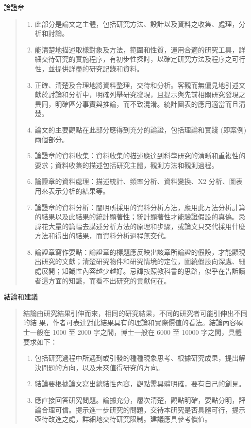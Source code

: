 \documentclass[
    writingLanguage=chinese, %
    addPageTitle=on,  %
    addDeclaration=on, %
    addMUSTlogo=on, %
    addFigTOC=on, %
    addTabTOC=on, %
    refIndent=off, %
    printMod=off, %
]{.def/must}
\begin{document}
\noindent\faHandORight 論證章
\begin{quote}
\begin{enumerate}
    \item 此部分是論文之主體，包括研究方法、設計以及資料之收集、處理，分析和討論。
    \item  能清楚地描述取樣對象及方法，範圍和性質，運用合適的研究工具，詳細交待研究的實施程序，有初步性探討，以確定研究方法及程序之可行性，並提供詳盡的研究記錄和資料。
    \item  正確、清楚及合理地將資料整理，交待和分析。客觀而無偏見地引述文獻於討論和分析中，明確列舉研究發現，且提示與先前相關研究發現之異同，明確區分事實與推論，而不致混淆。統計圖表的應用適當而且清楚。
    \item 論文的主要觀點在此部分應得到充分的論證，包括理論和實踐 (即案例)兩個部分。
    \item 論證章的資料收集：資料收集的描述應達到科學研究的清晰和重複性的要求；資料收集的描述包括研究主體，觀測方法和觀測過程。
    \item 論證章的資料處理：描述統計、頻率分析、資料變換、X2 分析、圖表用來表示分析的結果等。
    \item 論證章的資料分析：闡明所採用的資料分析方法，應用此方法分析計算的結果以及此結果的統計顯著性；統計顯著性才能驗證假設的真偽。忌諱花大量的篇幅去講述分析方法的原理和步驟，或論文只交代採用什麼方法和得出的結果，而資料分析過程無交代。
  \item 論證章寫作要點：論證章的標題應反映出該章所論證的假設，才能顯現出研究的文獻；清楚研究物件和研究情境的定位，圍繞假設向深處、細處展開；知識性內容越少越好。忌諱按照教科書的思路，似乎在告訴讀者這方面的知識，而看不出研究的貢獻何在。
\end{enumerate}

\end{quote}

\noindent\faHandORight 結論和建議
\begin{quote}
結論由研究結果引伸而來，相同的研究結果，不同的研究者可能引伸出不同的結
果，作者可表達對此結果具有的理論和實際價值的看法。結論內容碩士一般在
1000 至 2000 字之間，博士一般在 6000 至 10000 字之間，具體要求如下：

\begin{enumerate}
    \item 包括研究過程中所遇到或引發的種種現象思考、根據研究成果，提出解決問題的方向，以及未來值得研究的方向。
    \item 結論要根據論文寫出總結性內容，觀點需具體明確，要有自己的創見。
    \item 應直接回答研究問題。論據充分，層次清楚，觀點明確，要點分明，評論合理可信。提示進一步研究的問題，交待本研究是否具體可行，提示亟待改進之處，詳細地交待研究限制。建議應具參考價值。
\end{enumerate}
\end{quote}
\end{document}

